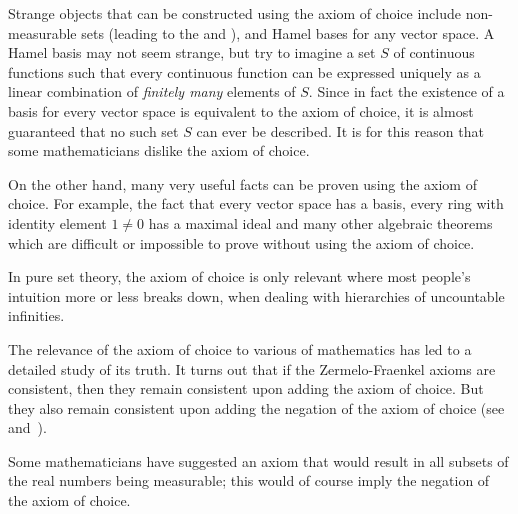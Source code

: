 \documentclass[12pt]{article}
\begin{document}
Strange objects that can be constructed using the axiom of choice include non-measurable sets (leading to the  and ), and Hamel bases for any vector space. A Hamel
basis may not seem strange, but try to imagine a set $S$ of continuous functions such that every continuous function can be expressed uniquely as a linear combination of \emph{finitely many} elements of $S$. Since in fact the existence of a basis for every vector space is equivalent to the axiom of
choice, it is almost guaranteed that no such set $S$ can ever be described. It is for this reason that some mathematicians dislike the axiom of choice.

On the other hand, many very useful facts can be proven using the axiom of choice. For example, the fact that every vector space has a basis, every ring with identity element $1\neq 0$ has a maximal ideal and many other algebraic theorems which are difficult or impossible to prove without using the axiom of choice.

In pure set theory, the axiom of choice is only relevant where most people's intuition more or less breaks down, when dealing with hierarchies of uncountable infinities.

The relevance of the axiom of choice to various  of mathematics has led to a detailed study of its truth. It turns out that if the Zermelo-Fraenkel axioms are consistent, then they remain consistent upon adding the axiom of choice. But they also remain consistent upon adding the negation of the axiom of choice (see~\cite{G} and~\cite{C}).

Some mathematicians have suggested an axiom that would result in all subsets of the real numbers being measurable; this would of course imply the negation of the axiom of choice.
\end{document}

